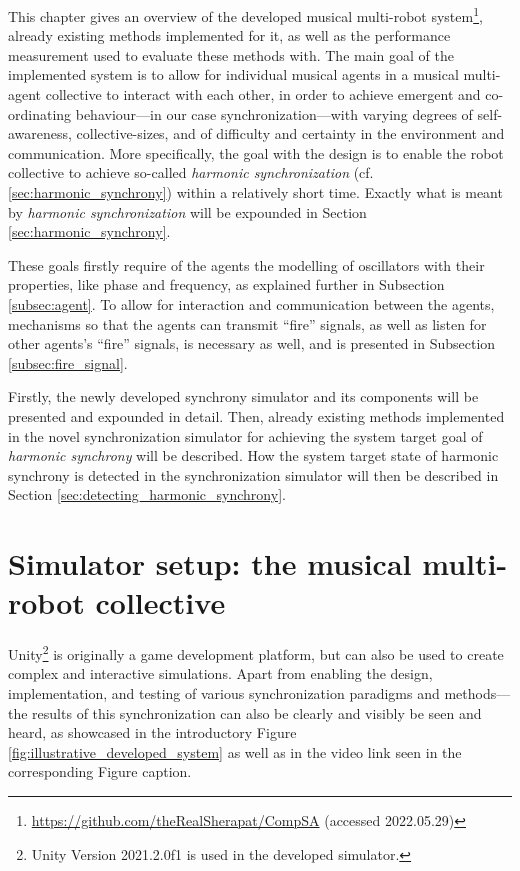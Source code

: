 This chapter gives an overview of the developed musical multi-robot system\footnote{\url{https://github.com/theRealSherapat/CompSA} (accessed 2022.05.29)}, already existing methods implemented for it, as well as the performance measurement used to evaluate these methods with. The main goal of the implemented system is to allow for individual musical agents in a musical multi-agent collective to interact with each other, in order to achieve emergent and co-ordinating behaviour—in our case synchronization—with varying degrees of self-awareness, collective-sizes, and of difficulty and certainty in the environment and communication. More specifically, the goal with the design is to enable the robot collective to achieve so-called \textit{harmonic synchronization} (cf. \ref{sec:harmonic_synchrony}) within a relatively short time. Exactly what is meant by \textit{harmonic synchronization} will be expounded in Section \ref{sec:harmonic_synchrony}.

These goals firstly require of the agents the modelling of oscillators with their properties, like phase and frequency, as explained further in Subsection \ref{subsec:agent}. To allow for interaction and communication between the agents, mechanisms so that the agents can transmit ``fire'' signals, as well as listen for other agents's ``fire'' signals, is necessary as well, and is presented in Subsection \ref{subsec:fire_signal}.

Firstly, the newly developed synchrony simulator and its components will be presented and expounded in detail. Then, already existing methods implemented in the novel synchronization simulator for achieving the system target goal of \textit{harmonic synchrony} will be described. How the system target state of harmonic synchrony is detected in the synchronization simulator will then be described in Section \ref{sec:detecting_harmonic_synchrony}.



\section{Simulator setup: the musical multi-robot collective}
\label{sec:developed_system}

Unity\footnote{Unity Version 2021.2.0f1 is used in the developed simulator.} is originally a game development platform, but can also be used to create complex and interactive simulations. Apart from enabling the design, implementation, and testing of various synchronization paradigms and methods—the results of this synchronization can also be clearly and visibly be seen and heard, as showcased in the introductory Figure \ref{fig:illustrative_developed_system} as well as in the video link seen in the corresponding Figure caption.

